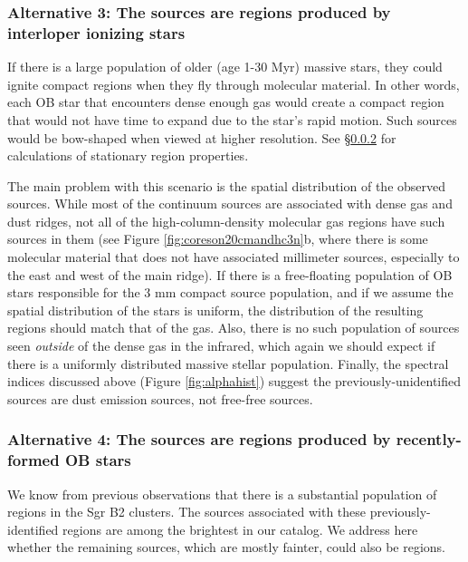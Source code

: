 \documentclass[twocolumn]{aastex61}
\begin{document}
\subsubsection{Alternative 3: The sources are \hii regions produced by
interloper ionizing stars}
\label{sec:alt2}
If there is a large population of older (age 1-30 Myr) massive stars, they
could ignite compact \hii regions when they fly through molecular material.  In
other words, each OB star that encounters dense enough gas would create a
compact \hii region that would not have time to expand due to the star's rapid
motion.  Such sources would be bow-shaped when viewed at higher resolution.
See \S \ref{sec:theyarehiiregions} for calculations of stationary \hii region
properties.

The main problem with this scenario is the spatial distribution of the observed
sources.  While most of the continuum sources are associated with dense gas and
dust ridges, not all of the high-column-density molecular gas regions have such
sources in them (see Figure \ref{fig:coreson20cmandhc3n}b, where there is some
molecular material that does not have associated millimeter sources,
especially to the east and west of the main ridge).  If there is a
free-floating population of OB stars responsible for the 3 mm compact source
population, and if we assume the spatial distribution of the stars is uniform,
the distribution of the resulting \hii regions should match that of the gas.
Also, there is no such population of sources seen \emph{outside} of the dense
gas in the infrared,
which again we should expect if there is a uniformly distributed massive stellar
population.  Finally, the spectral indices discussed above (Figure
\ref{fig:alphahist}) suggest the previously-unidentified sources are dust
emission sources, not free-free sources.



\subsubsection{Alternative 4: The sources are \hii regions produced by
recently-formed OB stars}
\label{sec:theyarehiiregions}

We know from previous observations
\citep[e.g.,][]{Mehringer1995b,De-Pree1996a,De-Pree2015a} that there is a
substantial population of \hii regions in the Sgr B2 clusters.  The \nhii
sources associated with these previously-identified \hii regions are among the
brightest in our catalog.  We address here whether the remaining  sources,
which are mostly fainter, could also be \hii regions.
\end{document}
